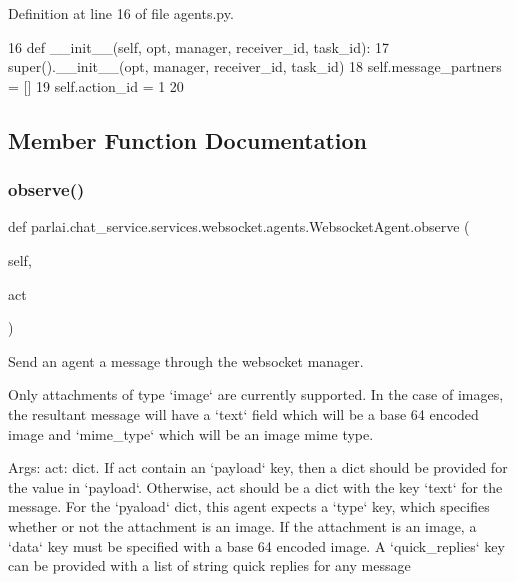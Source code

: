 Definition at line 16 of file agents.\+py.


\begin{DoxyCode}
16     \textcolor{keyword}{def }\_\_init\_\_(self, opt, manager, receiver\_id, task\_id):
17         super().\_\_init\_\_(opt, manager, receiver\_id, task\_id)
18         self.message\_partners = []
19         self.action\_id = 1
20 
\end{DoxyCode}


\subsection{Member Function Documentation}
\mbox{\label{classparlai_1_1chat__service_1_1services_1_1websocket_1_1agents_1_1WebsocketAgent_aae41aaeb0af93fb30a11e731167c596c}} 
\subsubsection{\texorpdfstring{observe()}{observe()}}
{\footnotesize\ttfamily def parlai.\+chat\+\_\+service.\+services.\+websocket.\+agents.\+Websocket\+Agent.\+observe (\begin{DoxyParamCaption}\item[{}]{self,  }\item[{}]{act }\end{DoxyParamCaption})}

\begin{DoxyVerb}Send an agent a message through the websocket manager.

Only attachments of type `image` are currently supported. In the case of
images, the resultant message will have a `text` field which will be a
base 64 encoded image and `mime_type` which will be an image mime type.

Args:
    act: dict. If act contain an `payload` key, then a dict should be
provided for the value in `payload`. Otherwise, act should be
a dict with the key `text` for the message.
For the `pyaload` dict, this agent expects a `type` key, which
specifies whether or not the attachment is an image. If the
attachment is an image, a `data` key must be specified with a
base 64 encoded image.
A `quick_replies` key can be provided with a list of string quick
replies for any message
\end{DoxyVerb}
 

